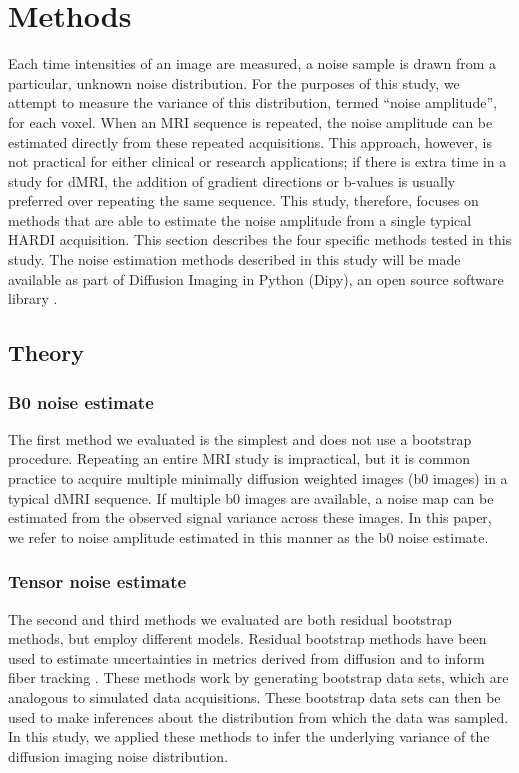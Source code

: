 \section{Methods}

Each time intensities of an image are measured, a noise sample is drawn
from a particular, unknown noise distribution. For the purposes of this
study, we attempt to measure the variance of this distribution, termed
``noise amplitude'', for each voxel. When an MRI sequence is repeated,
the noise amplitude can be estimated directly from these repeated
acquisitions. This approach, however, is not practical for either
clinical or research applications; if there is extra time in a study for
dMRI, the addition of gradient directions or b-values is usually
preferred over repeating the same sequence. This study, therefore,
focuses on methods that are able to estimate the noise amplitude from a
single typical HARDI acquisition. This section describes the four
specific methods tested in this study. The noise estimation methods
described in this study will be made available as part of Diffusion
Imaging in Python (Dipy), an open source software library \cite{Garyfallidis_2014}.

\subsection{Theory}
\subsubsection{B0 noise estimate}
The first method we evaluated is the simplest and does not use a
bootstrap procedure. Repeating an entire MRI study is impractical, but
it is common practice to acquire multiple minimally diffusion weighted
images (b0 images) in a typical dMRI sequence. If multiple b0 images are
available, a noise map can be estimated from the observed signal
variance across these images. In this paper, we refer to noise amplitude
estimated in this manner as the b0 noise estimate.

\subsubsection{Tensor noise estimate}
The second and third methods we evaluated are both residual bootstrap
methods, but employ different models. Residual bootstrap methods have
been used to estimate uncertainties in metrics derived from diffusion \cite{Chung_2006, Haroon_2009} and to inform fiber tracking \cite{17911030}. These methods work by generating bootstrap data sets, which are
analogous to simulated data acquisitions. These bootstrap data sets can
then be used to make inferences about the distribution from which the
data was sampled. In this study, we applied these methods to infer the
underlying variance of the diffusion imaging noise distribution.

